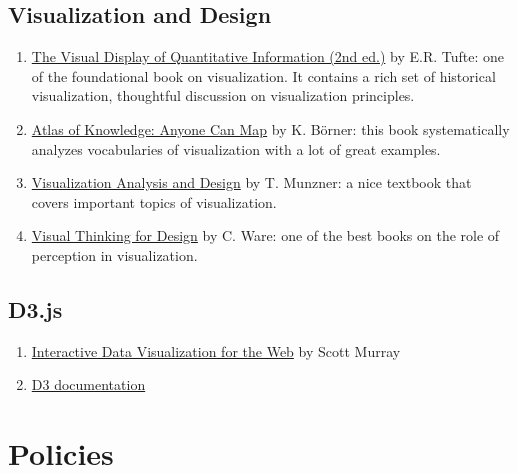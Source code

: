 \documentclass[11pt,article,oneside]{memoir}
\begin{document}
\subsection{Visualization and Design}

\begin{enumerate}

\item \href{http://www.amazon.com/gp/product/0961392142}{The Visual Display of Quantitative Information (2nd ed.)} by E.R. Tufte: one of the foundational book on visualization. It contains a rich set of historical visualization, thoughtful discussion on visualization principles. 

\item \href{http://www.amazon.com/Atlas-Knowledge-Anyone-Can-Map/dp/0262028816}{Atlas of Knowledge: Anyone Can Map} by K. Börner: this book systematically analyzes vocabularies of visualization with a lot of great examples. 

\item \href{http://www.amazon.com/Visualization-Analysis-Design-AK-Peters/dp/1466508914}{Visualization Analysis and Design} by T. Munzner: a nice textbook that covers important topics of visualization. 

\item \href{http://www.amazon.com/Visual-Thinking-Kaufmann-Interactive-Technologies/dp/0123708966}{Visual Thinking for Design} by C. Ware: one of the best books on the role of perception in visualization. 

\end{enumerate}

\subsection{D3.js}

\begin{enumerate}

\item \href{http://www.amazon.com/Interactive-Data-Visualization-Scott-Murray/dp/1449339735}{Interactive Data Visualization for the Web} by Scott Murray

\item \href{https://github.com/mbostock/d3/wiki}{D3 documentation}

\end{enumerate}

\section{Policies}
\end{document}
